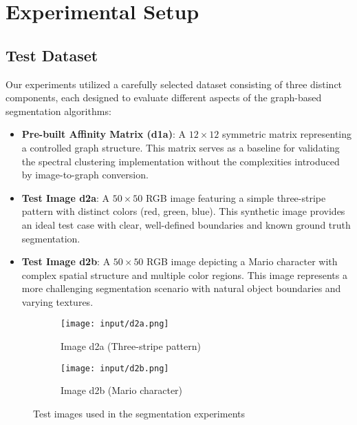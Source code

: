 \documentclass[12pt,a4paper]{article}
\begin{document}
{\section{Experimental Setup}

\subsection*{Test Dataset}

Our experiments utilized a carefully selected dataset consisting of three distinct components, each designed to evaluate different aspects of the graph-based segmentation algorithms:

\begin{itemize}
    \item \textbf{Pre-built Affinity Matrix (d1a)}: A $12 \times 12$ symmetric matrix representing a controlled graph structure. This matrix serves as a baseline for validating the spectral clustering implementation without the complexities introduced by image-to-graph conversion.
    
    \item \textbf{Test Image d2a}: A $50 \times 50$ RGB image featuring a simple three-stripe pattern with distinct colors (red, green, blue). This synthetic image provides an ideal test case with clear, well-defined boundaries and known ground truth segmentation.
    
    \item \textbf{Test Image d2b}: A $50 \times 50$ RGB image depicting a Mario character with complex spatial structure and multiple color regions. This image represents a more challenging segmentation scenario with natural object boundaries and varying textures.
\end{itemize}

\begin{figure}[H]
    \centering
    \begin{subfigure}{0.45\textwidth}
        \centering
        \texttt{[image: input/d2a.png]}
        \caption{Image d2a (Three-stripe pattern)}
        \label{fig:d2a_original}
    \end{subfigure}
    \hfill
    \begin{subfigure}{0.45\textwidth}
        \centering
        \texttt{[image: input/d2b.png]}
        \caption{Image d2b (Mario character)}
        \label{fig:d2b_original}
    \end{subfigure}
    \caption{Test images used in the segmentation experiments}
    \label{fig:test_images}
\end{figure}








}
\end{document}
